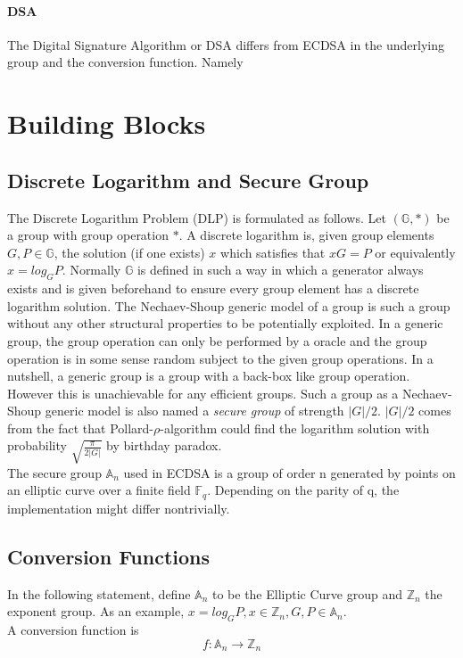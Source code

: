 \documentclass[18]{article}
\begin{document}
\paragraph{DSA}
The Digital Signature Algorithm or DSA differs from ECDSA in the underlying group and the conversion function. Namely


\section{Building Blocks}
\subsection{Discrete Logarithm and Secure Group}
The Discrete Logarithm Problem (DLP) is formulated as follows.
Let $(\mathbb{G}, *)$ be a group with group operation $*$.
A discrete logarithm is, given group elements $G,P \in \mathbb{G}$,
the solution (if one exists) $x$ which satisfies that $xG=P$
or equivalently $x=log_GP$.
Normally $\mathbb{G}$ is defined in such a way in which
 a generator always exists and is given beforehand
 to ensure every group element has a discrete logarithm solution.
The Nechaev-Shoup generic model of a group is such a group without
 any other structural properties to be potentially exploited.
 In a generic group, the group operation can only be performed by a oracle
 and the group operation is in some sense random subject
 to the given group operations. In a nutshell, a generic group is a group with a back-box like group operation.
 However this is unachievable for any efficient groups.
  Such a group as a Nechaev-Shoup generic model is also named a \textit{secure group} of strength $|G|/2$. $|G|/2$ comes from the fact that Pollard-$\rho$-algorithm could find the logarithm solution with probability $\sqrt{\frac{\pi}{2|G|}}$ by birthday paradox.\\
  The secure group $\mathbb{A}_n$ used in ECDSA is a group of order n generated by points on an elliptic curve over a finite field $\mathbb{F}_q$.
  Depending on the parity of q, the implementation might differ nontrivially.

\subsection{Conversion Functions}
  In the following statement, define $\mathbb{A}_n$ to be the
  Elliptic Curve group and $\mathbb{Z}_n$ the exponent group.
  As an example, $x=log_GP, x \in \mathbb{Z}_n, G,P \in \mathbb{A}_n$.\\
  A conversion function is
  \begin{equation}
  f:\mathbb{A}_n \to \mathbb{Z}_n
  \end{equation}
\end{document}
